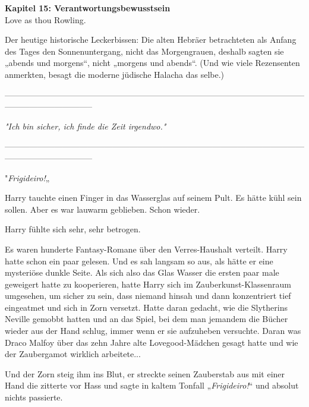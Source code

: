

\hypertarget{verantwortungsbewusstsein}{%

\textbf{Kapitel 15: Verantwortungsbewusstsein}\\

\hfill\break Love as thou Rowling.

Der heutige historische Leckerbissen: Die alten Hebräer betrachteten als Anfang des Tages den Sonnenuntergang, nicht das Morgengrauen, deshalb sagten sie „abends und morgens“, nicht „morgens und abends“. (Und wie viele Rezensenten anmerkten, besagt die moderne jüdische Halacha das selbe.)

--------------------------------------------------------------------------------------------------------------------------------------------

\hfill\break

\emph{"Ich bin sicher, ich finde die Zeit irgendwo."}

\hfill\break

--------------------------------------------------------------------------------------------------------------------------------------------

\hfill\break "\emph{Frigideiro!}„

Harry tauchte einen Finger in das Wasserglas auf seinem Pult. Es hätte kühl sein sollen. Aber es war lauwarm geblieben. Schon wieder.

Harry fühlte sich sehr, sehr betrogen.

Es waren hunderte Fantasy-Romane über den Verres-Haushalt verteilt. Harry hatte schon ein paar gelesen. Und es sah langsam so aus, als hätte er eine mysteriöse dunkle Seite. Als sich also das Glas Wasser die ersten paar male geweigert hatte zu kooperieren, hatte Harry sich im Zauberkunst-Klassenraum umgesehen, um sicher zu sein, dass niemand hinsah und dann konzentriert tief eingeatmet und sich in Zorn versetzt. Hatte daran gedacht, wie die Slytherins Neville gemobbt hatten und an das Spiel, bei dem man jemandem die Bücher wieder aus der Hand schlug, immer wenn er sie aufzuheben versuchte. Daran was Draco Malfoy über das zehn Jahre alte Lovegood-Mädchen gesagt hatte und wie der Zaubergamot wirklich arbeitete...

Und der Zorn steig ihm ins Blut, er streckte seinen Zauberstab aus mit einer Hand die zitterte vor Hass und sagte in kaltem Tonfall „\emph{Frigideiro!}“ und absolut nichts passierte.

}
